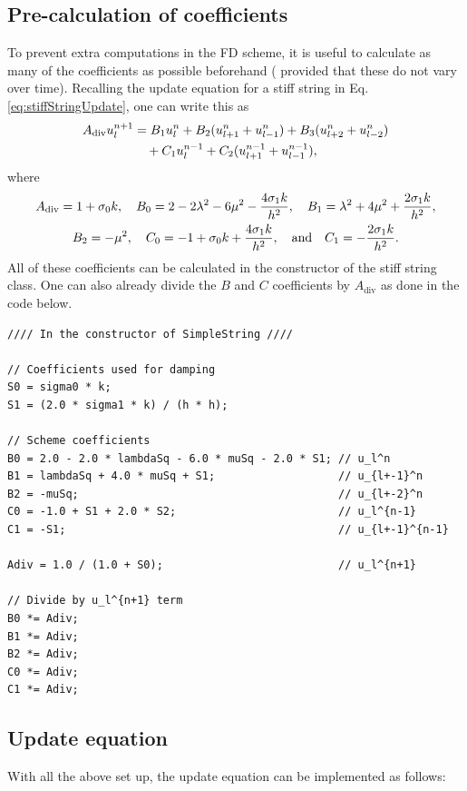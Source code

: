\subsection{Pre-calculation of coefficients}
To prevent extra computations in the FD scheme, it is useful to calculate as many of the coefficients as possible beforehand ( provided that these do not vary over time). Recalling the update equation for a stiff string in Eq. \eqref{eq:stiffStringUpdate}, one can write this as
\begin{equation}
    \begin{aligned}
        A_\text{div} u_l^{n+1} &= B_1 u_l^n + B_2 (u_{l+1}^n + u_{l-1}^n) + B_3(u_{l+2}^n + u_{l-2}^n) \\
        &\quad+ C_1u_l^{n-1}+ C_2(u_{l+1}^{n-1} + u_{l-1}^{n-1}),
    \end{aligned}
    \end{equation}
where
\begin{gather*}
    A_\text{div} = 1+\sigma_{0} k, \quad B_0 = 2 - 2\lambda^2 - 6\mu^2 - \frac{4\sigma_{1} k}{h^2}, \quad B_1 = \lambda^2 + 4\mu^2 + \frac{2\sigma_{1} k}{h^2},\\
    B_2 = - \mu^2, \quad C_0 = -1+\sigma_{0} k + \frac{4\sigma_{1} k}{h^2},\quad \text{and} \quad C_1 = - \frac{2\sigma_{1} k}{h^2}.
\end{gather*}
All of these coefficients can be calculated in the constructor of the stiff string class. One can also already divide the $B$ and $C$ coefficients by $A_\text{div}$ as done in the code below.
\setlstCpp
\begin{lstlisting}[]
//// In the constructor of SimpleString ////

// Coefficients used for damping
S0 = sigma0 * k;
S1 = (2.0 * sigma1 * k) / (h * h);

// Scheme coefficients
B0 = 2.0 - 2.0 * lambdaSq - 6.0 * muSq - 2.0 * S1; // u_l^n
B1 = lambdaSq + 4.0 * muSq + S1;                   // u_{l+-1}^n
B2 = -muSq;                                        // u_{l+-2}^n
C0 = -1.0 + S1 + 2.0 * S2;                         // u_l^{n-1}
C1 = -S1;                                          // u_{l+-1}^{n-1}

Adiv = 1.0 / (1.0 + S0);                           // u_l^{n+1}

// Divide by u_l^{n+1} term
B0 *= Adiv;
B1 *= Adiv;
B2 *= Adiv;
C0 *= Adiv;
C1 *= Adiv;
\end{lstlisting}

\subsection{Update equation}\label{sec:updateEquationCpp}
With all the above set up, the update equation can be implemented as follows:

